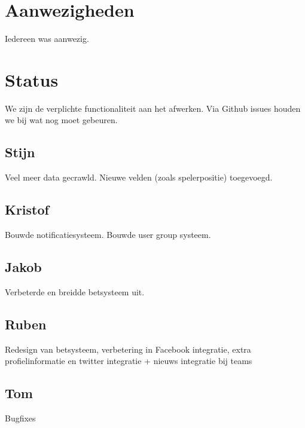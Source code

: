\documentclass[11pt, a4paper]{article}
\begin{document}
\title{}
\author{Groep A}
\date{14 mei 2014}
\maketitle

\section{Aanwezigheden}
Iedereen was aanwezig.
\section{Status}
We zijn de verplichte functionaliteit aan het afwerken. Via Github issues houden we bij wat nog moet gebeuren.
\subsection{Stijn}
Veel meer data gecrawld. Nieuwe velden (zoals spelerpositie) toegevoegd.
\subsection{Kristof}
Bouwde notificatiesysteem. Bouwde user group systeem.
\subsection{Jakob}
Verbeterde en breidde betsysteem uit.
\subsection{Ruben}
Redesign van betsysteem, verbetering in Facebook integratie, extra profielinformatie en twitter integratie + nieuws integratie bij teams
\subsection{Tom}
Bugfixes
\end{document}

